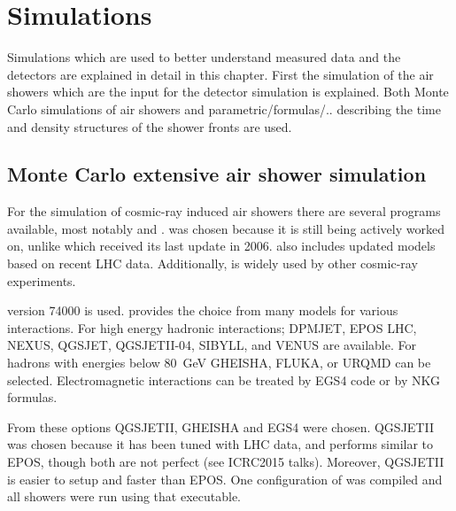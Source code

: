 \chapter{Simulations}
\label{ch:simulations}

Simulations which are used to better understand measured data and the
detectors are explained in detail in this chapter. First the simulation
of the air showers which are the input for the detector simulation is
explained. Both Monte Carlo simulations of air showers and
parametric/formulas/.. describing the time and density structures of the
shower fronts are used.


\section{Monte Carlo extensive air shower simulation}

For the simulation of cosmic-ray induced air showers there are several
programs available, most notably \corsika and \aires\cite{sciutto1999}.
\corsika was chosen because it is still being actively worked on, unlike
\aires which received its last update in 2006. \corsika also includes
updated models based on recent LHC data. Additionally, \corsika is widely
used by other cosmic-ray experiments.

\corsika version 74000 is used. \corsika provides the choice from many
models for various interactions. For high energy hadronic interactions;
DPMJET, EPOS LHC\cite{pierog2013}, NEXUS, QGSJET,
QGSJETII-04\cite{ostapchenko2013}, SIBYLL, and VENUS are available. For
hadrons with energies below \SI{80}{\GeV}
GHEISHA\cite{fesefeldt1985}, FLUKA, or URQMD can be selected.
Electromagnetic interactions can be treated by EGS4\cite{egs4} code or
by NKG formulas.

From these options QGSJETII, GHEISHA and EGS4 were chosen. QGSJETII was chosen
because it has been tuned with LHC data, and performs similar to EPOS, though
both are not perfect (see ICRC2015 talks). Moreover, QGSJETII is easier to
setup and faster than EPOS. One configuration of \corsika was compiled and all
showers were run using that executable.

%
%


